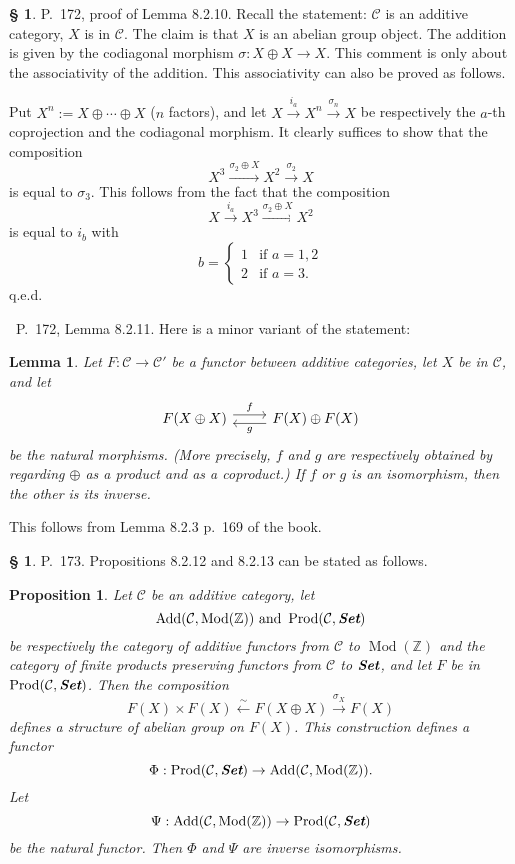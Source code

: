 \documentclass[12pt]{article}
\newtheorem{lem}[thm]{Lemma}
\newtheorem{prop}[thm]{Proposition}
\theoremstyle{remark}
\theoremstyle{definition}
\newtheorem{cm}[thm]{\S}
\newcommand{\bc}{\begin{cm}}\newcommand{\ec}{\end{cm}}
\newcommand{\C}{\mathcal C}
\newcommand{\xr}{\xrightarrow}
\newcommand{\pr}{Proposition}
\DeclareMathOperator{\Mod}{Mod}
\begin{document}

\bc P.~172, proof of Lemma 8.2.10. Recall the statement: $\C$ is an additive category, $X$ is in $\C$. The claim is that $X$ is an abelian group object. The addition is given by the codiagonal morphism $\sigma:X\oplus X\to X$. This comment is only about the associativity of the addition. This associativity can also be proved as follows. 

Put $X^n:=X\oplus\cdots\oplus X$ ($n$ factors), and let $X\xr{i_a}X^n\xr{\sigma_n}X$ be respectively the $a$-th coprojection and the codiagonal morphism. It clearly suffices to show that the composition 
$$
X^3\xr{\sigma_2\oplus X}X^2\xr{\sigma_2}X
$$ 
is equal to $\sigma_3$. This follows from the fact that the composition 
$$
X\xr{i_a}X^3\xr{\sigma_2\oplus X}X^2
$$ 
is equal to $i_b$ with 
$$
b=\begin{cases}1&\text{if }a=1,2\\2&\text{if }a=3.\end{cases}
$$ 
q.e.d.
\ec 


\ P.~172, Lemma 8.2.11. Here is a minor variant of the statement: 
%
\begin{lem}
Let $F:\C\to\C'$ be a functor between additive categories, let $X$ be in $\C$, and let 
$$
\begin{tikzcd}
F(X\oplus X)\ar[yshift=.7ex]{r}{f}&F(X)\oplus F(X)\ar[yshift=-.7ex]{l}{g}
\end{tikzcd}
$$ 
be the natural morphisms. (More precisely, $f$ and $g$ are respectively obtained by regarding $\oplus$ as a product and as a coproduct.) If $f$ or $g$ is an isomorphism, then the other is its inverse. 
\end{lem}
% 
This follows from Lemma 8.2.3 p.~169 of the book.\bigskip 


\bc P.~173. \pr s 8.2.12 and 8.2.13 can be stated as follows. 
%
\begin{prop}\label{8212}
%
Let $\C$ be an additive category, let 
$$
\operatorname{Add}(\C,\Mod(\mathbb Z))\text{ and }\operatorname{Prod}(\C,\textbf{\em Set})
$$ 
be respectively the category of additive functors from $\C$ to $\Mod(\mathbb Z)$ and the category of finite products preserving functors from $\C$ to $\textbf{\em Set}$, and let $F$ be in $\operatorname{Prod}(\C,\textbf{\em Set})$. Then the composition 
$$
F(X)\times F(X)\xleftarrow\sim F(X\oplus X)\xr{\sigma_X}F(X)
$$ 
defines a structure of abelian group on $F(X)$. This construction defines a functor 
$$
\Phi:\operatorname{Prod}(\C,\textbf{\em Set})\to\operatorname{Add}(\C,\Mod(\mathbb Z)).
$$ 
Let 
$$
\Psi:\operatorname{Add}(\C,\Mod(\mathbb Z))\to\operatorname{Prod}(\C,\textbf{\em Set})
$$ 
be the natural functor. Then $\Phi$ and $\Psi$ are inverse isomorphisms. 
%
\end{prop}
\ec 
\end{document}
